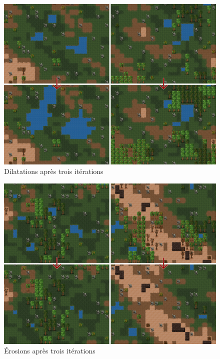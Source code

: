 \documentclass[a4paper]{memoir}
\begin{document}
			\begin{figure}
				\begin{center}
					\includegraphics[scale=0.2]{img/Dilatation.png}
				\end{center}
				\label{fig:dilatation}
				\caption{Dilatations après trois itérations}
			\end{figure}
			\begin{figure}
				\begin{center}
					\includegraphics[scale=0.2]{img/Erosion.png}
				\end{center}
				\label{fig:erosion}
				\caption{\'Erosions après trois itérations}
			\end{figure}
\end{document}
